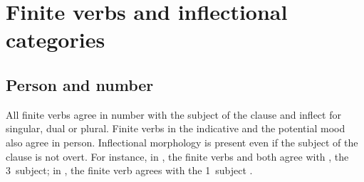 \section{Finite verbs and inflectional categories}\label{inflectionalCatsVerbs}


\subsection{Person and number}\label{personNumberVerbs}
All finite verbs agree in number with the subject of the clause and inflect for singular, dual or plural. 
Finite verbs in the indicative and the potential mood also agree in person. %
Inflectional morphology is present even if the subject of the clause is not overt. 
For instance, in , the finite verbs  and  both agree with , the 3\PLs\ subject; in , the finite verb  agrees with the 1\DUs\ subject .

